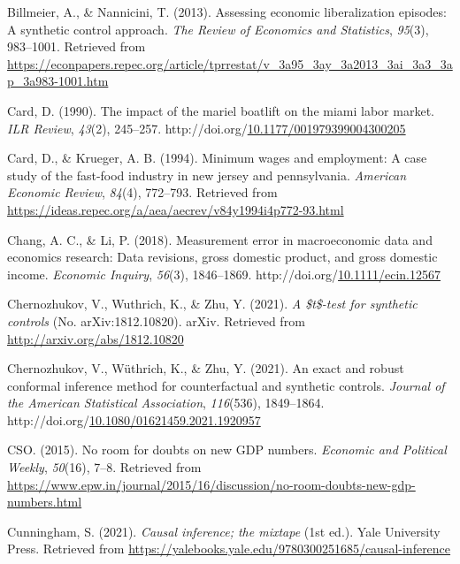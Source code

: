 \documentclass[12pt,nobind, a4paper]{reedthesis}
\newlength{\cslhangindent}
\newenvironment{CSLReferences}[2] %
{%
	\setlength{\parindent}{0pt}
	\ifodd #1 \everypar{\setlength{\hangindent}{\cslhangindent}}\ignorespaces\fi
	\ifnum #2 > 0
	\setlength{\parskip}{#2\baselineskip}
	\fi
}%
{}
\begin{document}
\begin{CSLReferences}{1}{0}
 \leavevmode{}%
 Billmeier, A., \& Nannicini, T. (2013). Assessing economic liberalization episodes: A synthetic control approach. \emph{The Review of Economics and Statistics}, \emph{95}(3), 983--1001. Retrieved from \url{https://econpapers.repec.org/article/tprrestat/v_3a95_3ay_3a2013_3ai_3a3_3ap_3a983-1001.htm}

 \leavevmode{}%
 Card, D. (1990). The impact of the mariel boatlift on the miami labor market. \emph{{ILR} Review}, \emph{43}(2), 245--257. http://doi.org/\href{https://doi.org/10.1177/001979399004300205}{10.1177/001979399004300205}

 \leavevmode{}%
 Card, D., \& Krueger, A. B. (1994). Minimum wages and employment: A case study of the fast-food industry in new jersey and pennsylvania. \emph{American Economic Review}, \emph{84}(4), 772--793. Retrieved from \url{https://ideas.repec.org/a/aea/aecrev/v84y1994i4p772-93.html}

 \leavevmode{}%
 Chang, A. C., \& Li, P. (2018). Measurement error in macroeconomic data and economics research: Data revisions, gross domestic product, and gross domestic income. \emph{Economic Inquiry}, \emph{56}(3), 1846--1869. http://doi.org/\href{https://doi.org/10.1111/ecin.12567}{10.1111/ecin.12567}

 \leavevmode{}%
 Chernozhukov, V., Wuthrich, K., \& Zhu, Y. (2021). \emph{A \$t\$-test for synthetic controls} (No. {arXiv}:1812.10820). {arXiv}. Retrieved from \url{http://arxiv.org/abs/1812.10820}

 \leavevmode{}%
 Chernozhukov, V., Wüthrich, K., \& Zhu, Y. (2021). An exact and robust conformal inference method for counterfactual and synthetic controls. \emph{Journal of the American Statistical Association}, \emph{116}(536), 1849--1864. http://doi.org/\href{https://doi.org/10.1080/01621459.2021.1920957}{10.1080/01621459.2021.1920957}

 \leavevmode{}%
 CSO. (2015). No room for doubts on new {GDP} numbers. \emph{Economic and Political Weekly}, \emph{50}(16), 7--8. Retrieved from \url{https://www.epw.in/journal/2015/16/discussion/no-room-doubts-new-gdp-numbers.html}

 \leavevmode{}%
 Cunningham, S. (2021). \emph{Causal inference; the mixtape} (1st ed.). Yale University Press. Retrieved from \url{https://yalebooks.yale.edu/9780300251685/causal-inference}


\end{CSLReferences}
\end{document}
